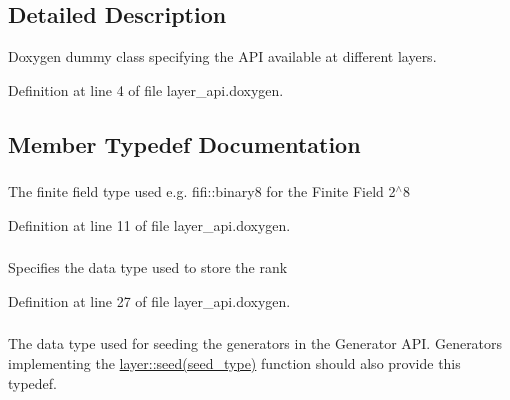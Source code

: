 \subsection{Detailed Description}
Doxygen dummy class specifying the A\-P\-I available at different layers. 

Definition at line 4 of file layer\-\_\-api.\-doxygen.



\subsection{Member Typedef Documentation}
\hypertarget{classlayer_a495d6846a7311be01266914e60e7d9c6}{
\subsubsection[{field\-\_\-type}]{}}\label{classlayer_a495d6846a7311be01266914e60e7d9c6}
The finite field type used e.\-g. fifi\-::binary8 for the Finite Field 2$^\wedge$8 

Definition at line 11 of file layer\-\_\-api.\-doxygen.

\hypertarget{classlayer_a1de820b75c9af3faf024dee2b22599e4}{
\subsubsection[{rank\-\_\-type}]{}}\label{classlayer_a1de820b75c9af3faf024dee2b22599e4}
Specifies the data type used to store the rank 

Definition at line 27 of file layer\-\_\-api.\-doxygen.

\hypertarget{classlayer_abd92e03d53ae960a9ef1e7a63fa06ccb}{
\subsubsection[{seed\-\_\-type}]{}}\label{classlayer_abd92e03d53ae960a9ef1e7a63fa06ccb}
The data type used for seeding the generators in the Generator A\-P\-I. Generators implementing the \hyperlink{group__coefficient__generator__api_ga4afaaccc0d847e2c8ba021cc4e8c9672}{layer\-::seed(seed\-\_\-type)} function should also provide this typedef. 

